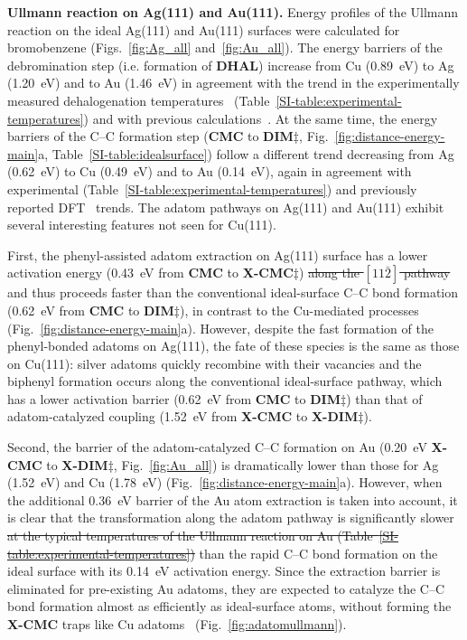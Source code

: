 \documentclass[aps,prb,amsmath,amssymb,11pt]{revtex4-1}
\newcommand{\zhzh}{\color{blue}}
\begin{document}
\textbf{Ullmann reaction on Ag(111) and Au(111).}
%
Energy profiles of the Ullmann reaction on the ideal Ag(111) and Au(111) surfaces were calculated for bromobenzene (Figs.~\ref{fig:Ag_all} and~\ref{fig:Au_all}). 
The energy barriers of the debromination step {\zhzh (i.e. formation of \textbf{DHAL})} increase from Cu (\SI{0.89}{\electronvolt}) to Ag (\SI{1.20}{\electronvolt}) and to Au (\SI{1.46}{\electronvolt}) in agreement with the trend in the experimentally measured dehalogenation temperatures~\cite{ullmann_52,ullmann_87,ullmann_67} (Table~\ref{SI-table:experimental-temperatures}) and with previous calculations~\cite{jacs2013}.
At the same time, the energy barriers of the C--C formation step ({\zhzh \textbf{CMC} to \textbf{DIM$\ddagger$},} Fig.~\ref{fig:distance-energy-main}a, Table~\ref{SI-table:idealsurface}) follow a different trend decreasing from Ag (\SI{0.62}{\electronvolt}) to Cu (\SI{0.49}{\electronvolt}) and to Au (\SI{0.14}{\electronvolt}), again in agreement with experimental (Table~\ref{SI-table:experimental-temperatures}) and previously reported DFT~\cite{jacs2013} trends. The adatom pathways on Ag(111) and Au(111) exhibit several interesting features not seen for Cu(111).

First, the phenyl-assisted adatom extraction on Ag(111) surface has a lower activation energy (\SI{0.43}{\electronvolt} {\zhzh from \textbf{CMC} to \textbf{X-CMC$\ddagger$}}) \sout{along the $[11\bar{2}]$ pathway} and thus proceeds faster than the conventional ideal-surface C--C bond formation (\SI{0.62}{\electronvolt} {\zhzh from \textbf{CMC} to \textbf{DIM}$\ddagger$}), in contrast to the Cu-mediated processes (Fig.~\ref{fig:distance-energy-main}a). However, despite the fast formation of the phenyl-bonded adatoms on Ag(111), the fate of these species is the same as those on Cu(111): silver adatoms quickly recombine with their vacancies and the biphenyl formation occurs along the conventional ideal-surface pathway, which has a lower activation barrier (\SI{0.62}{\electronvolt} {\zhzh from \textbf{CMC} to \textbf{DIM}$\ddagger$}) than that of adatom-catalyzed coupling (\SI{1.52}{\electronvolt} {\zhzh from \textbf{X-CMC} to \textbf{X-DIM}$\ddagger$}).

Second, the barrier of the adatom-catalyzed C--C formation on Au (\SI{0.20}{\electronvolt} {\zhzh \textbf{X-CMC} to \textbf{X-DIM}$\ddagger$, Fig.~\ref{fig:Au_all}}) is dramatically lower than those for Ag (\SI{1.52}{\electronvolt}) and Cu (\SI{1.78}{\electronvolt}) (Fig.~\ref{fig:distance-energy-main}a). 
However, when the additional \SI{0.36}{\electronvolt} barrier of the Au atom extraction is taken into account, it is clear that
the transformation along the adatom pathway is significantly slower \sout{at the typical temperatures of the Ullmann reaction on Au (Table~\ref{SI-table:experimental-temperatures})} than the rapid C--C bond formation on the ideal surface with its \SI{0.14}{\electronvolt} activation energy. 
Since the extraction barrier is eliminated for pre-existing Au adatoms, they are expected to catalyze the C--C bond formation almost as efficiently as ideal-surface atoms, without forming the \textbf{X-CMC} traps like Cu adatoms~\cite{ullmann_65} (Fig.~\ref{fig:adatomullmann}).
\end{document}
